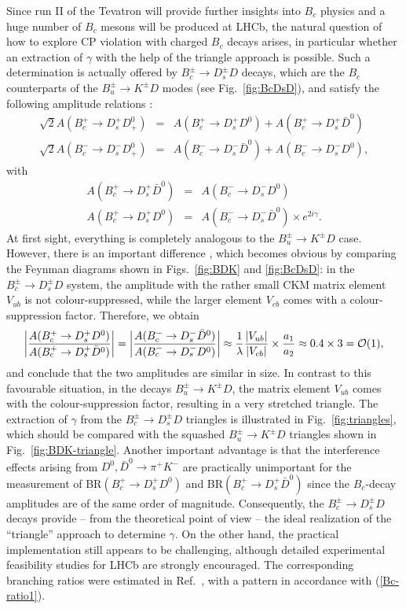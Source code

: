 \documentclass[11pt]{cernrep}
\begin{document}
Since run II of the Tevatron will provide further insights into $B_c$ physics and 
a huge number of $B_c$ mesons will be produced at LHCb, the 
natural question of how to explore CP violation with charged $B_c$ decays arises,
in particular whether an extraction of $\gamma$ with the help of the
triangle approach is possible.  Such a determination is actually offered by 
$B_c^\pm\to D_s^\pm D$ decays, which are the $B_c$ counterparts 
of the $B_u^\pm\to K^\pm D$ modes (see Fig.\ \ref{fig:BcDsD}), 
and satisfy the following amplitude relations \cite{masetti}:
\begin{eqnarray}
\sqrt{2}A(B_c^+\to D_s^+D^0_+)&=&A(B_c^+\to D_s^+D^0)+
A(B_c^+\to D_s^+\bar D^0)\\
\sqrt{2}A(B_c^-\to D_s^-D^0_+)&=&A(B_c^-\to D_s^-\bar D^0)+
A(B_c^-\to D_s^-D^0),
\end{eqnarray}
with
\begin{eqnarray}
A(B^+_c\to D_s^+\bar D^0)&=&A(B^-_c\to D_s^-D^0)\\
A(B_c^+\to D_s^+D^0)&=&A(B_c^-\to D_s^-\bar D^0)\times e^{2i\gamma}.
\end{eqnarray}
At first sight, everything is completely analogous to the $B_u^\pm\to K^\pm D$
case. However, there is an important difference \cite{fw}, 
which becomes obvious by comparing the Feynman diagrams shown in 
Figs.~\ref{fig:BDK} and \ref{fig:BcDsD}: in the $B_c^\pm\to D_s^\pm D$ 
system, the amplitude with the rather small CKM matrix element $V_{ub}$ 
is not colour-suppressed, while the larger element $V_{cb}$ comes with 
a colour-suppression factor. Therefore, we obtain
\begin{equation}\label{Bc-ratio1}
\left|\frac{A(B^+_c\to D_s^+ D^0)}{A(B^+_c\to D_s^+ 
\bar D^0)}\right|=\left|\frac{A(B^-_c\to D_s^-\bar D^0)}{A(B^-_c\to D_s^- 
D^0)}\right|\approx\frac{1}{\lambda}\frac{|V_{ub}|}{|V_{cb}|}
\times\frac{a_1}{a_2}\approx0.4\times 3 = {\cal O}(1),
\end{equation}
and conclude that the two amplitudes are similar in size. In contrast 
to this favourable situation, in the decays $B_u^{\pm}\to K^{\pm}D$, 
the matrix element $V_{ub}$ comes with the colour-suppression factor, 
resulting in a very stretched triangle. The extraction of $\gamma$ from 
the $B_c^\pm\to D_s^\pm D$ triangles is illustrated in 
Fig.~\ref{fig:triangles}, which should be compared with the
squashed $B^\pm_u\to K^\pm D$ triangles shown in 
Fig.\ \ref{fig:BDK-triangle}. Another important advantage is that 
the interference effects arising from $D^0,\bar D^0\to\pi^+K^-$ are 
practically unimportant for the measurement of BR$(B^+_c\to D_s^+ D^0)$ 
and BR$(B^+_c\to D_s^+ \bar D^0)$ since the $B_c$-decay amplitudes are 
of the same order of magnitude. Consequently, the $B_c^\pm\to D_s^\pm D$
decays provide -- from the theoretical point of view -- the ideal
realization of the ``triangle'' approach to determine $\gamma$. On
the other hand, the practical implementation still appears to 
be challenging, although detailed experimental feasibility studies for
LHCb are strongly encouraged. The corresponding branching ratios
were estimated in Ref.~\cite{IKP}, with a pattern in accordance 
with (\ref{Bc-ratio1}). 
\end{document}
